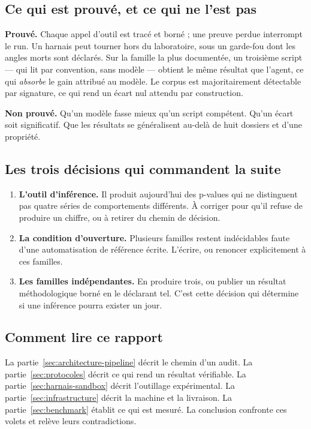 \subsection{Ce qui est prouvé, et ce qui ne l'est pas}

\textbf{Prouvé.} Chaque appel d'outil est tracé et borné ; une preuve perdue
interrompt le run. Un harnais peut tourner hors du laboratoire, sous un garde-fou
dont les angles morts sont déclarés. Sur la famille la plus documentée, un
troisième script --- qui lit par convention, sans modèle --- obtient le même
résultat que l'agent, ce qui \emph{absorbe} le gain attribué au modèle. Le corpus
est majoritairement détectable par signature, ce qui rend un écart nul attendu
par construction.

\textbf{Non prouvé.} Qu'un modèle fasse mieux qu'un script compétent. Qu'un
écart soit significatif. Que les résultats se généralisent au-delà de huit
dossiers et d'une propriété.

\subsection{Les trois décisions qui commandent la suite}

\begin{enumerate}
\item \textbf{L'outil d'inférence.} Il produit aujourd'hui des p-values qui ne
distinguent pas quatre séries de comportements différents. À corriger pour qu'il
refuse de produire un chiffre, ou à retirer du chemin de décision.
\item \textbf{La condition d'ouverture.} Plusieurs familles restent indécidables
faute d'une automatisation de référence écrite. L'écrire, ou renoncer
explicitement à ces familles.
\item \textbf{Les familles indépendantes.} En produire trois, ou publier un
résultat méthodologique borné en le déclarant tel. C'est cette décision qui
détermine si une inférence pourra exister un jour.
\end{enumerate}

\subsection{Comment lire ce rapport}

La partie~\ref{sec:architecture-pipeline} décrit le chemin d'un audit.
La partie~\ref{sec:protocoles} décrit ce qui rend un résultat vérifiable.
La partie~\ref{sec:harnais-sandbox} décrit l'outillage expérimental.
La partie~\ref{sec:infrastructure} décrit la machine et la livraison.
La partie~\ref{sec:benchmark} établit ce qui est mesuré.
La conclusion confronte ces volets et relève leurs contradictions.

